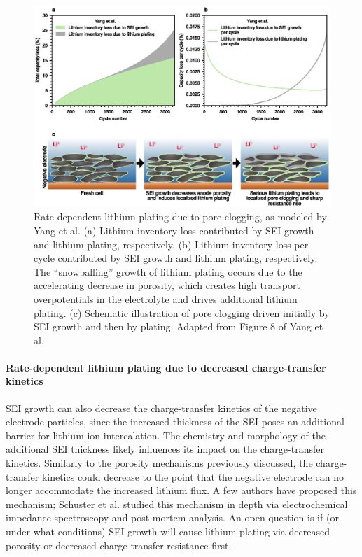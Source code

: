\documentclass[journal=jpclcd,manuscript=article]{achemso}
\begin{document}
\begin{figure}[hp]
    \centering
    \includegraphics[scale=1]{figures/yang_remade.eps}
    \caption{Rate-dependent lithium plating due to pore clogging, as modeled by Yang et al.\cite{yang_modeling_2017} (a) Lithium inventory loss contributed by SEI growth and lithium plating, respectively. (b) Lithium inventory loss per cycle contributed by SEI growth and lithium plating, respectively. The ``snowballing'' growth of lithium plating occurs due to the accelerating decrease in porosity, which creates high transport overpotentials in the electrolyte and drives additional lithium plating. (c) Schematic illustration of pore clogging driven initially by SEI growth and then by plating. Adapted from Figure 8 of Yang et al.\cite{yang_modeling_2017}}
    \label{fig:pore_clogging}
\end{figure}

\paragraph{Rate-dependent lithium plating due to decreased charge-transfer kinetics}
SEI growth can also decrease the charge-transfer kinetics of the negative electrode particles, since the increased thickness of the SEI poses an additional barrier for lithium-ion intercalation.\cite{xu_differentiating_2010, pinson_theory_2013, li_li-desolvation_2017}
The chemistry and morphology of the additional SEI thickness likely influences its impact on the charge-transfer kinetics.\cite{lu_lithium_2011, xu_electrolytes_2014}
Similarly to the porosity mechanisms previously discussed, the charge-transfer kinetics could decrease to the point that the negative electrode can no longer accommodate the increased lithium flux.
A few authors have proposed this mechanism\cite{klett_non-uniform_2014, ecker_calendar_2014}{}; Schuster et al.\cite{schuster_nonlinear_2015} studied this mechanism in depth via electrochemical impedance spectroscopy and post-mortem analysis.
An open question is if (or under what conditions) SEI growth will cause lithium plating via decreased porosity or decreased charge-transfer resistance first.
\end{document}
